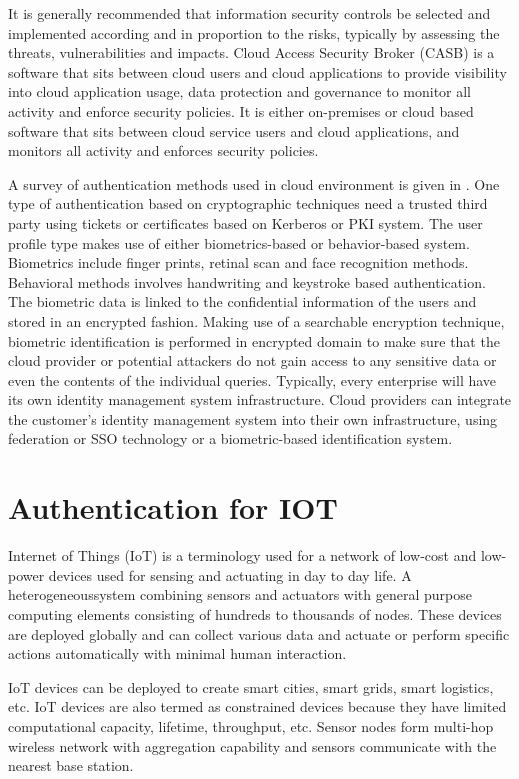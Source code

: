 \begin{multicols}{2}
It is generally recommended that information security controls be selected and implemented according and in proportion to the risks, typically by assessing the threats, vulnerabilities and impacts. Cloud Access Security Broker (CASB) is a software that sits between cloud users and cloud applications to provide visibility into cloud application usage, data protection and governance to monitor all activity and enforce security policies. It is either on-premises or cloud based software that sits between cloud service users and cloud applications, and monitors all activity and enforces security policies. 

A survey of authentication methods used in cloud environment is given in \cite{chap2-key18}. One type of authentication based on cryptographic techniques need a trusted third party using tickets or certificates based on Kerberos or PKI system. The user profile type makes use of either biometrics-based or behavior-based system. Biometrics include finger prints, retinal scan and face recognition methods. Behavioral methods involves handwriting and keystroke based authentication. The biometric data is linked to the confidential information of the users and stored in an encrypted fashion. Making use of a searchable encryption technique, biometric identification is performed in encrypted domain to make sure that the cloud provider or potential attackers do not gain access to any sensitive data or even the contents of the individual queries. Typically, every enterprise will have its own identity management system infrastructure. Cloud providers can integrate the customer's identity management system into their own infrastructure, using federation or SSO technology or a biometric-based identification system.

\section*{Authentication for IOT}

Internet of Things (IoT) is a terminology used for a network of low-cost and low-power devices used for sensing and actuating in day to day life. A heterogeneous\break system combining sensors and actuators with general purpose computing elements consisting of hundreds to thousands of nodes. These devices are deployed globally and can collect various data and actuate or perform specific actions automatically with minimal human interaction.

IoT devices can be deployed to create smart cities, smart grids, smart logistics, etc. IoT devices are also termed as constrained devices because they have limited computational capacity, lifetime, throughput, etc. Sensor nodes form multi-hop wireless network with aggregation capability and sensors communicate with the nearest base station. 


\end{multicols}
